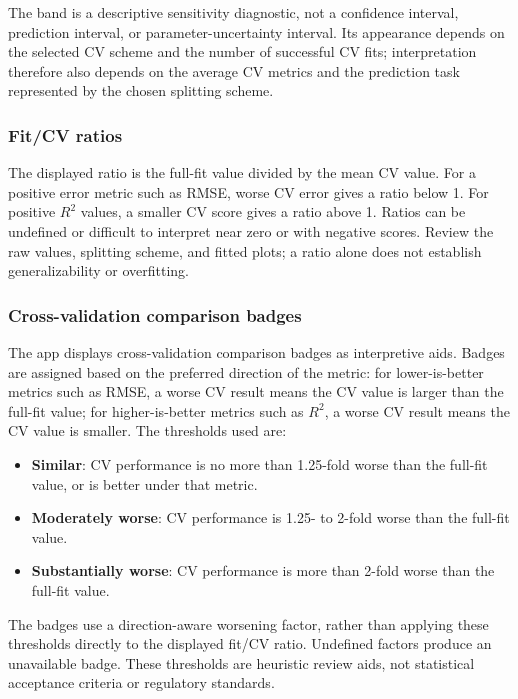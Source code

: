 The band is a descriptive sensitivity diagnostic, not a confidence interval, prediction interval, or parameter-uncertainty interval. Its appearance depends on the selected CV scheme and the number of successful CV fits; interpretation therefore also depends on the average CV metrics and the prediction task represented by the chosen splitting scheme.

\subsubsection*{Fit/CV ratios}

The displayed ratio is the full-fit value divided by the mean CV value. For a positive error metric such as RMSE, worse CV error gives a ratio below 1. For positive $R^2$ values, a smaller CV score gives a ratio above 1. Ratios can be undefined or difficult to interpret near zero or with negative scores. Review the raw values, splitting scheme, and fitted plots; a ratio alone does not establish generalizability or overfitting.

\subsubsection*{Cross-validation comparison badges}

The app displays cross-validation comparison badges as interpretive aids. Badges are assigned based on the preferred direction of the metric: for lower-is-better metrics such as RMSE, a worse CV result means the CV value is larger than the full-fit value; for higher-is-better metrics such as $R^2$, a worse CV result means the CV value is smaller. The thresholds used are:

\begin{itemize}
    \item \textbf{Similar}: CV performance is no more than 1.25-fold worse than the full-fit value, or is better under that metric.
    \item \textbf{Moderately worse}: CV performance is 1.25- to 2-fold worse than the full-fit value.
    \item \textbf{Substantially worse}: CV performance is more than 2-fold worse than the full-fit value.
\end{itemize}

The badges use a direction-aware worsening factor, rather than applying these thresholds directly to the displayed fit/CV ratio. Undefined factors produce an unavailable badge. These thresholds are heuristic review aids, not statistical acceptance criteria or regulatory standards.

